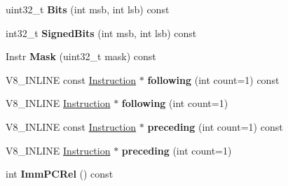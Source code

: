 \begin{DoxyCompactItemize}
\item 
uint32\+\_\+t {\bfseries Bits} (int msb, int lsb) const \hypertarget{classv8_1_1internal_1_1_instruction_acf48804514600b7045f823880c531a35}{}\label{classv8_1_1internal_1_1_instruction_acf48804514600b7045f823880c531a35}

\item 
int32\+\_\+t {\bfseries Signed\+Bits} (int msb, int lsb) const \hypertarget{classv8_1_1internal_1_1_instruction_ad15e4a98bcf6938956c5f1d02c5a779c}{}\label{classv8_1_1internal_1_1_instruction_ad15e4a98bcf6938956c5f1d02c5a779c}

\item 
Instr {\bfseries Mask} (uint32\+\_\+t mask) const \hypertarget{classv8_1_1internal_1_1_instruction_ace0de5f362b99e8f35498624ee489a0a}{}\label{classv8_1_1internal_1_1_instruction_ace0de5f362b99e8f35498624ee489a0a}

\item 
V8\+\_\+\+I\+N\+L\+I\+NE const \hyperlink{classv8_1_1internal_1_1_instruction}{Instruction} $\ast$ {\bfseries following} (int count=1) const \hypertarget{classv8_1_1internal_1_1_instruction_a2515f6e4c406a7937d6daf0ba087b049}{}\label{classv8_1_1internal_1_1_instruction_a2515f6e4c406a7937d6daf0ba087b049}

\item 
V8\+\_\+\+I\+N\+L\+I\+NE \hyperlink{classv8_1_1internal_1_1_instruction}{Instruction} $\ast$ {\bfseries following} (int count=1)\hypertarget{classv8_1_1internal_1_1_instruction_ab45df0a5def9cbf4c9d54cacd76945eb}{}\label{classv8_1_1internal_1_1_instruction_ab45df0a5def9cbf4c9d54cacd76945eb}

\item 
V8\+\_\+\+I\+N\+L\+I\+NE const \hyperlink{classv8_1_1internal_1_1_instruction}{Instruction} $\ast$ {\bfseries preceding} (int count=1) const \hypertarget{classv8_1_1internal_1_1_instruction_abf95863a0ae53d6effbb00c3f0fc9694}{}\label{classv8_1_1internal_1_1_instruction_abf95863a0ae53d6effbb00c3f0fc9694}

\item 
V8\+\_\+\+I\+N\+L\+I\+NE \hyperlink{classv8_1_1internal_1_1_instruction}{Instruction} $\ast$ {\bfseries preceding} (int count=1)\hypertarget{classv8_1_1internal_1_1_instruction_a496c1fb4fbfec20f6de26b830bf2783e}{}\label{classv8_1_1internal_1_1_instruction_a496c1fb4fbfec20f6de26b830bf2783e}

\item 
int {\bfseries Imm\+P\+C\+Rel} () const \hypertarget{classv8_1_1internal_1_1_instruction_a2fac0aa45e257a269c33af3144de0462}{}\label{classv8_1_1internal_1_1_instruction_a2fac0aa45e257a269c33af3144de0462}


\end{DoxyCompactItemize}
